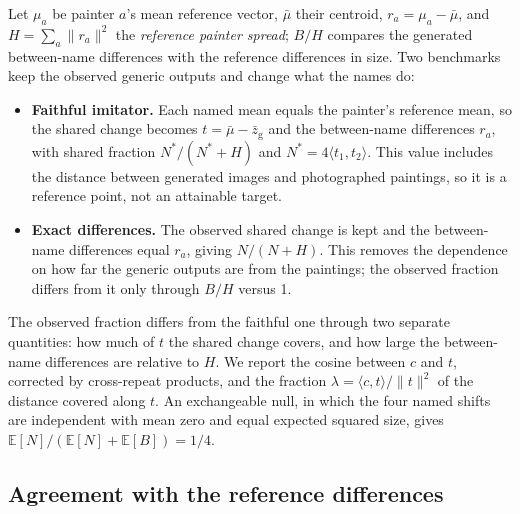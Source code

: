 \documentclass[10pt]{article}
\newcommand{\ip}[2]{\langle #1,#2\rangle}
\begin{document}
Let $\mu_a$ be painter $a$'s mean reference vector, $\bar\mu$ their centroid, $r_a=\mu_a-\bar\mu$,
and $H=\sum_a\|r_a\|^2$ the \emph{reference painter spread}; $B/H$ compares the generated
between-name differences with the reference differences in size. Two benchmarks keep the observed
generic outputs and change what the names do:
\begin{itemize}
\item \textbf{Faithful imitator.} Each named mean equals the painter's reference mean, so the
shared change becomes $t=\bar\mu-\bar z_{\mathrm{g}}$ and the between-name differences $r_a$, with
shared fraction $N^*/(N^*+H)$ and $N^*=4\ip{t_1}{t_2}$. This value includes the distance between
generated images and photographed paintings, so it is a reference point, not an attainable target.
\item \textbf{Exact differences.} The observed shared change is kept and the between-name
differences equal $r_a$, giving $N/(N+H)$. This removes the dependence on how far the generic
outputs are from the paintings; the observed fraction differs from it only through $B/H$
versus 1.
\end{itemize}
The observed fraction differs from the faithful one through two separate quantities: how much of
$t$ the shared change covers, and how large the between-name differences are relative to $H$.
We report the cosine between $c$ and $t$, corrected by cross-repeat products, and the fraction
$\lambda=\ip{c}{t}/\|t\|^2$ of the distance covered along $t$. An exchangeable null, in which the
four named shifts are independent with mean zero and equal expected squared size, gives
$\mathbb E[N]/(\mathbb E[N]+\mathbb E[B])=1/4$.

\subsection{Agreement with the reference differences}\label{sec:agreement-method}
\end{document}
